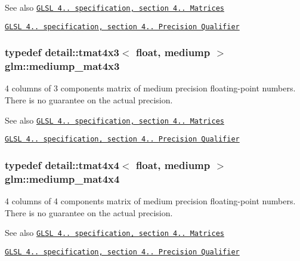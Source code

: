 \begin{DoxySeeAlso}{See also}
\href{http://www.opengl.org/registry/doc/GLSLangSpec.4.20.8.pdf}{\tt G\+L\+SL 4.. specification, section 4.. Matrices} 

\href{http://www.opengl.org/registry/doc/GLSLangSpec.4.20.8.pdf}{\tt G\+L\+SL 4.. specification, section 4.. Precision Qualifier} 
\end{DoxySeeAlso}
\subsubsection[{\texorpdfstring{mediump\+\_\+mat4x3}{mediump_mat4x3}}]{\setlength{\rightskip}{0pt plus 5cm}typedef detail\+::tmat4x3$<$ float, mediump $>$ {\bf glm\+::mediump\+\_\+mat4x3}}\hypertarget{group__core__precision_ga445d8aac3a5227af2d1e98d5c2f74d03}{}\label{group__core__precision_ga445d8aac3a5227af2d1e98d5c2f74d03}
4 columns of 3 components matrix of medium precision floating-\/point numbers. There is no guarantee on the actual precision.

\begin{DoxySeeAlso}{See also}
\href{http://www.opengl.org/registry/doc/GLSLangSpec.4.20.8.pdf}{\tt G\+L\+SL 4.. specification, section 4.. Matrices} 

\href{http://www.opengl.org/registry/doc/GLSLangSpec.4.20.8.pdf}{\tt G\+L\+SL 4.. specification, section 4.. Precision Qualifier} 
\end{DoxySeeAlso}
\subsubsection[{\texorpdfstring{mediump\+\_\+mat4x4}{mediump_mat4x4}}]{\setlength{\rightskip}{0pt plus 5cm}typedef detail\+::tmat4x4$<$ float, mediump $>$ {\bf glm\+::mediump\+\_\+mat4x4}}\hypertarget{group__core__precision_gacb51d2d10f7607617ac544f6db9a6eef}{}\label{group__core__precision_gacb51d2d10f7607617ac544f6db9a6eef}
4 columns of 4 components matrix of medium precision floating-\/point numbers. There is no guarantee on the actual precision.

\begin{DoxySeeAlso}{See also}
\href{http://www.opengl.org/registry/doc/GLSLangSpec.4.20.8.pdf}{\tt G\+L\+SL 4.. specification, section 4.. Matrices} 

\href{http://www.opengl.org/registry/doc/GLSLangSpec.4.20.8.pdf}{\tt G\+L\+SL 4.. specification, section 4.. Precision Qualifier} 
\end{DoxySeeAlso}
